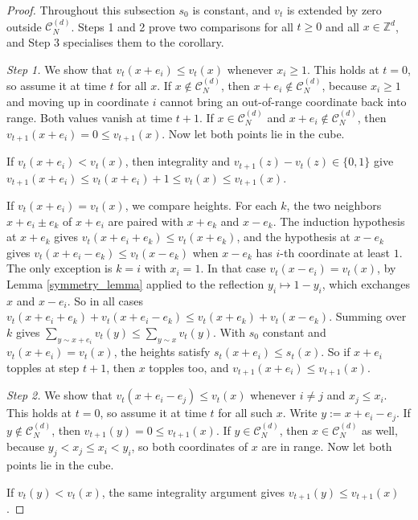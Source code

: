 \documentclass[12pt]{amsart}
\newcommand{\Z}{\mathbb{Z}}
\begin{document}
	\begin{proof}
Throughout this subsection $s_0$ is constant, and $v_t$ is extended by zero outside $\mathcal C_N^{(d)}$. Steps 1 and 2 prove two comparisons for all $t\geq0$ and all $x\in\Z^d$, and Step 3 specialises them to the corollary.

\emph{Step 1.} We show that $v_t(x+e_i)\leq v_t(x)$ whenever $x_i\geq1$. This holds at $t=0$, so assume it at time $t$ for all $x$. If $x\notin\mathcal C_N^{(d)}$, then $x+e_i\notin\mathcal C_N^{(d)}$, because $x_i\geq1$ and moving up in coordinate $i$ cannot bring an out-of-range coordinate back into range. Both values vanish at time $t+1$. If $x\in\mathcal C_N^{(d)}$ and $x+e_i\notin\mathcal C_N^{(d)}$, then $v_{t+1}(x+e_i)=0\leq v_{t+1}(x)$. Now let both points lie in the cube.

If $v_t(x+e_i)<v_t(x)$, then integrality and $v_{t+1}(z)-v_t(z)\in\{0,1\}$ give $v_{t+1}(x+e_i)\leq v_t(x+e_i)+1\leq v_t(x)\leq v_{t+1}(x)$.

If $v_t(x+e_i)=v_t(x)$, we compare heights. For each $k$, the two neighbors $x+e_i\pm e_k$ of $x+e_i$ are paired with $x+e_k$ and $x-e_k$. The induction hypothesis at $x+e_k$ gives $v_t(x+e_i+e_k)\leq v_t(x+e_k)$, and the hypothesis at $x-e_k$ gives $v_t(x+e_i-e_k)\leq v_t(x-e_k)$ when $x-e_k$ has $i$-th coordinate at least $1$. The only exception is $k=i$ with $x_i=1$. In that case $v_t(x-e_i)=v_t(x)$, by Lemma \ref{symmetry_lemma} applied to the reflection $y_i\mapsto 1-y_i$, which exchanges $x$ and $x-e_i$. So in all cases $v_t(x+e_i+e_k)+v_t(x+e_i-e_k)\leq v_t(x+e_k)+v_t(x-e_k)$. Summing over $k$ gives $\sum_{y\sim x+e_i}v_t(y)\leq\sum_{y\sim x}v_t(y)$. With $s_0$ constant and $v_t(x+e_i)=v_t(x)$, the heights satisfy $s_t(x+e_i)\leq s_t(x)$. So if $x+e_i$ topples at step $t+1$, then $x$ topples too, and $v_{t+1}(x+e_i)\leq v_{t+1}(x)$.

\emph{Step 2.} We show that $v_t(x+e_i-e_j)\leq v_t(x)$ whenever $i\neq j$ and $x_j\leq x_i$. This holds at $t=0$, so assume it at time $t$ for all such $x$. Write $y:=x+e_i-e_j$. If $y\notin\mathcal C_N^{(d)}$, then $v_{t+1}(y)=0\leq v_{t+1}(x)$. If $y\in\mathcal C_N^{(d)}$, then $x\in\mathcal C_N^{(d)}$ as well, because $y_j<x_j\leq x_i<y_i$, so both coordinates of $x$ are in range. Now let both points lie in the cube.

If $v_t(y)<v_t(x)$, the same integrality argument gives $v_{t+1}(y)\leq v_{t+1}(x)$.


\end{proof}
\end{document}
